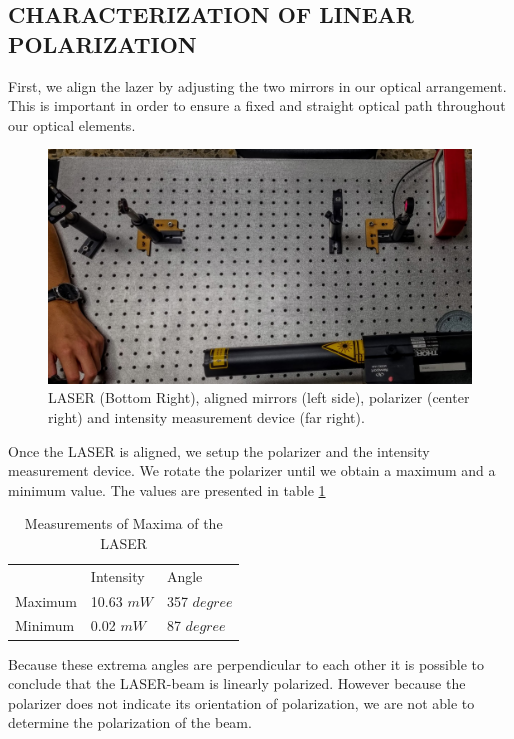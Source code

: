 \label{sec:RESULTS}

\subsection{CHARACTERIZATION OF LINEAR POLARIZATION}
First, we align the lazer by adjusting the two mirrors in our optical arrangement. This is important in order to ensure a fixed and straight optical path throughout our optical elements.\\

\begin{figure}[H]
    \centering
    \includegraphics[scale=0.14]{Figures/Polarization_1setup.jpg}
    \caption{LASER (Bottom Right), aligned mirrors (left side), polarizer (center right) and intensity measurement device (far right).}
    \label{fig:Setup1}
\end{figure}

Once the LASER is aligned, we setup the polarizer and the intensity measurement device. We rotate the polarizer until we obtain a maximum and a minimum value. The values are presented in table \ref{Tab:LPs}\\ 

\begin{table}[H]
\begin{center}
\begin{tabular}{|l|l|l|}
        & Intensity  & Angle        \\
Maximum & 10.63 $mW$ & 357 $degree$ \\
Minimum & 0.02 $mW$  & 87 $degree$ 
\end{tabular}
\caption{Measurements of Maxima of the LASER}
\label{Tab:LPs}
\end{center}
\end{table}

Because these extrema angles are perpendicular to each other it is possible to conclude that the LASER-beam is linearly polarized. However because the polarizer does not indicate its orientation of polarization, we are not able to determine the polarization of the beam.  \\

